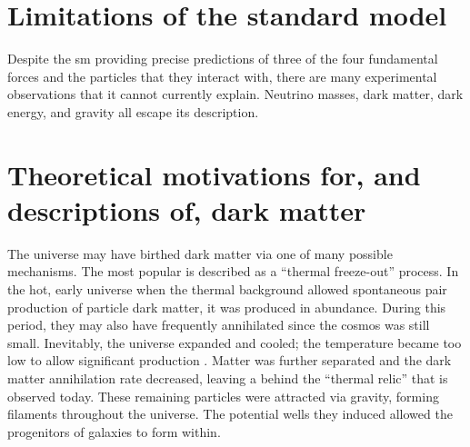 



\section{Limitations of the standard model}
\label{sec:sm_limitations}


Despite the \acrlong{sm} providing precise predictions of three of the four fundamental forces and the particles that they interact with, there are many experimental observations that it cannot currently explain. Neutrino masses, dark matter, dark energy, and gravity all escape its description.



\section{Theoretical motivations for, and descriptions of, dark matter}
\label{sec:theory_dark_matter}


The universe may have birthed dark matter via one of many possible mechanisms. The most popular is described as a ``thermal freeze-out'' process. In the hot, early universe when the thermal background allowed spontaneous pair production of particle dark matter, it was produced in abundance. During this period, they may also have frequently annihilated since the cosmos was still small. Inevitably, the universe expanded and cooled; the temperature became too low to allow significant production \cite{Baldes:2017gzw}. Matter was further separated and the dark matter annihilation rate decreased, leaving a behind the ``thermal relic'' that is observed today. These remaining particles were attracted via gravity, forming filaments throughout the universe. The potential wells they induced allowed the progenitors of galaxies to form within.


